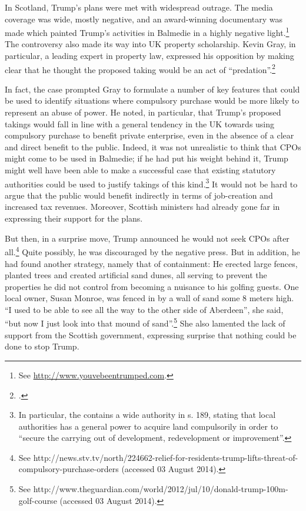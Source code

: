 \documentclass[12pt,a4paper]{book} %
\begin{document}
In Scotland, Trump's plans were met with widespread outrage. The media coverage was wide, mostly negative, and an award-winning documentary was made which painted Trump's activities in Balmedie in a highly negative light.\footnote{See \url{http://www.youvebeentrumped.com}.} The controversy also made its way into UK property scholarship. Kevin Gray, in particular, a leading expert in property law, expressed his opposition by making clear that he thought the proposed taking would be an act of ``predation''.\footcite{gray11}

In fact, the case prompted Gray to formulate a number of key features that could be used to identify situations where compulsory purchase would be more likely to represent an abuse of power. He noted, in particular, that Trump's proposed takings would fall in line with a general tendency in the UK towards using compulsory purchase to benefit private enterprise, even in the absence of a clear and direct benefit to the public. Indeed, it was not unrealistic to think that CPOs might come to be used in Balmedie; if he had put his weight behind it, Trump might well have been able to make a successful case that existing statutory authorities could be used to justify takings of this kind.\footnote{In particular, the \cite{tcpsa97} contains a wide authority in s. 189, stating that local authorities has a general power to acquire land compulsorily in order to ``secure the carrying out of development, redevelopment or improvement''.} It would not be hard to argue that the public would benefit indirectly in terms of job-creation and increased tax revenues. Moreover, Scottish ministers had already gone far in expressing their support for the plans.

But then, in a surprise move, Trump announced he would not seek CPOs after all.\footnote{See http://news.stv.tv/north/224662-relief-for-residents-trump-lifts-threat-of-compulsory-purchase-orders (accessed 03 August 2014).} Quite possibly, he was discouraged by the negative press. But in addition, he had found another strategy, namely that of containment: He erected large fences, planted trees and created artificial sand dunes, all serving to prevent the properties he did not control from becoming a nuisance to his golfing guests. One local owner, Susan Monroe, was fenced in by a wall of sand some 8 meters high. ``I used to be able to see all the way to the other side of Aberdeen'', she said, ``but now I just look into that mound of sand''.\footnote{See http://www.theguardian.com/world/2012/jul/10/donald-trump-100m-golf-course (accessed 03 August 2014).} She also lamented the lack of support from the Scottish government, expressing surprise that nothing could be done to stop Trump.
\end{document}
